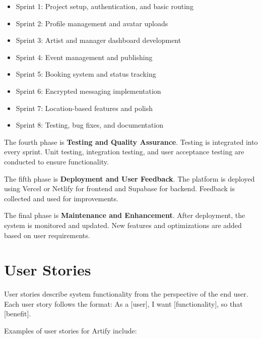 \documentclass[12pt,a4paper]{report}
\begin{document}
\begin{itemize}
\item Sprint 1: Project setup, authentication, and basic routing

\item Sprint 2: Profile management and avatar uploads

\item Sprint 3: Artist and manager dashboard development

\item Sprint 4: Event management and publishing

\item Sprint 5: Booking system and status tracking

\item Sprint 6: Encrypted messaging implementation

\item Sprint 7: Location-based features and polish

\item Sprint 8: Testing, bug fixes, and documentation
\end{itemize}

The fourth phase is \textbf{Testing and Quality Assurance}. Testing is integrated into every sprint. Unit testing, integration testing, and user acceptance testing are conducted to ensure functionality.

The fifth phase is \textbf{Deployment and User Feedback}. The platform is deployed using Vercel or Netlify for frontend and Supabase for backend. Feedback is collected and used for improvements.

The final phase is \textbf{Maintenance and Enhancement}. After deployment, the system is monitored and updated. New features and optimizations are added based on user requirements.

\section{User Stories}

User stories describe system functionality from the perspective of the end user. Each user story follows the format: As a [user], I want [functionality], so that [benefit].

Examples of user stories for Artify include:
\end{document}
